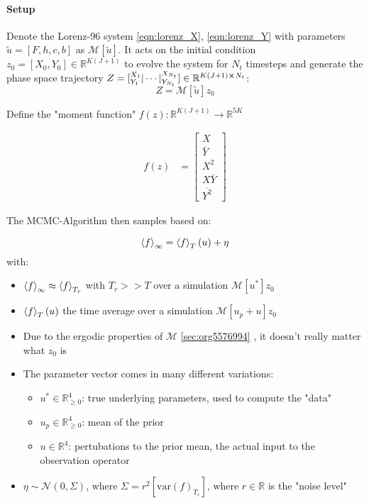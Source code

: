 \documentclass[11pt]{article}
\newcommand{\R}{{\mathbb{R}}}
\newcommand{\N}[2]{\mathcal{N}\left(#1,#2\right)}
\begin{document}
\paragraph{Setup}
\label{sec:org4a43fd0}
Denote the Lorenz-96 system \ref{eqn:lorenz_X}, \ref{eqn:lorenz_Y} with parameters \(\tilde{u} = [F, h, c, b]\) as
\(\mathcal{M}[\tilde{u}]\). It acts on the initial condition \(z_0 = [X_0, Y_0] \in \R^{K(J+1)}\) to evolve
the system for \(N_t\) timesteps and generate the phase space trajectory
\(Z = \left[ \smash{{}^{X_1}_{Y_1}} | \cdots | \smash{{}^{X_{N_t}}_{Y_{N_t}}}  \right] \in
   \R^{K(J+1) \cross N_t}\):
$$Z = \mathcal{M}[\tilde{u}] z_0$$

Define the "moment function" \(f(z): \R^{K(J+1)} \to \R^{5K}\)

\begin{align}
  f(z) &=
  \begin{bmatrix}
    X \\
    \bar{Y} \\
    X^2 \\
    X \bar{Y} \\
    \overline{Y^2}
  \end{bmatrix}
\end{align}

The MCMC-Algorithm then samples based on:

$$\expval{f}_\infty = \expval{f}_T(u) + \eta$$
with:
\begin{itemize}
\item \(\expval{f}_\infty \approx \expval{f}_{T_r}\) with \(T_r >> T\) over a simulation \(\mathcal{M}[u^*] z_0\)
\item \(\expval{f}_T(u)\) the time average over a simulation \(\mathcal{M}[u_p + u] z_0\)
\item Due to the ergodic properties of \(\mathcal{M}\) \ref{sec:org5576994} , it doesn't really matter what \(z_0\) is
\item The parameter vector comes in many different variations:
\begin{itemize}
\item \(u^* \in \R^4_{\geq 0}\): true underlying parameters, used to compute the "data"
\item \(u_p \in \R^4_{\geq 0}\): mean of the prior
\item \(u \in \R^4\): pertubations to the prior mean, the actual input to the observation operator
\end{itemize}
\item \(\eta \sim \N{0}{\Sigma}\), where \(\Sigma = r^2 [\text{var}(f)_{T_r}]\),
where \(r \in \R\) is the "noise level"
\end{itemize}
\end{document}
